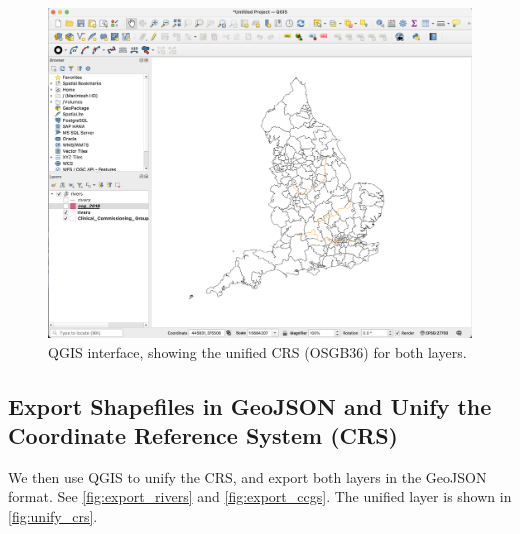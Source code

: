 {    \begin{figure}[tbh!]
        \centering
        \includegraphics[width=\columnwidth]{figure/qgis/unify_crs.png}
        \caption{QGIS interface, showing the unified CRS (OSGB36) for both layers.}
        \label{fig:unify_crs}
    \end{figure}
}

\subsection{Export Shapefiles in GeoJSON and Unify the Coordinate Reference System (CRS)}

We then use QGIS to unify the CRS, and export both layers in the GeoJSON format. See \autoref{fig:export_rivers} and \autoref{fig:export_ccgs}. The unified layer is shown in \autoref{fig:unify_crs}.

